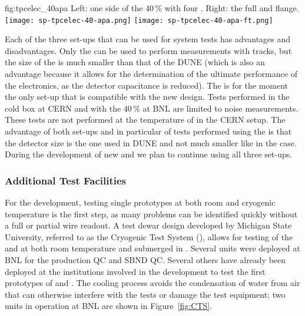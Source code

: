 \begin{dunefigure}
{fig:tpcelec_40apa}
{Left: one side of the \num{40}\,\%  with four .  Right: the full  \fdth and flange.}
\texttt{[image: sp-tpcelec-40-apa.png]}
\hspace{3mm}
\texttt{[image: sp-tpcelec-40-apa-ft.png]}
\end{dunefigure}

Each of the three set-ups that can be used for system tests has advantages
and disadvantages. Only the   can be used to 
perform measurements with tracks, but the size of the  is 
much smaller than that of the DUNE (which is also an advantage because it
allows for the determination of the ultimate performance of the electronics,
as the detector capacitance is reduced). The  
is for the moment the only set-up that is compatible with the new 
design. Tests performed in the cold box at CERN and with the \num{40}\,\%  
at BNL are limited to noise measurements. These tests are not
performed at the temperature of \lar in the CERN setup. The advantage of
both set-ups and in particular of tests performed using the 
 is that the detector size is the one used in DUNE and not
much smaller like in the  case. During the development
of new  and  we plan to continue using all
three set-ups.

\subsubsection{Additional Test Facilities}
\label{sec:fdsp-tpcelec-qa-facilities-additional}

For the  development, testing single prototypes at both room and
cryogenic temperature is the first step, as many problems can be identified
quickly without a full or partial  wire readout. A test dewar
design developed by Michigan State University, referred to as the
Cryogenic Test System (), allows for testing of the  and
 at both room temperature and submerged in \lntwo. Several  units
were deployed at BNL for the  production  QC and SBND  QC.
Several others have already been deployed at the institutions involved in
the  development to test the first prototypes of 
and .  The  cooling process avoids the condensation
of water from air that can otherwise interfere with the tests or damage the
test equipment; two  units in operation at BNL are shown in Figure~\ref{fig:CTS}.


